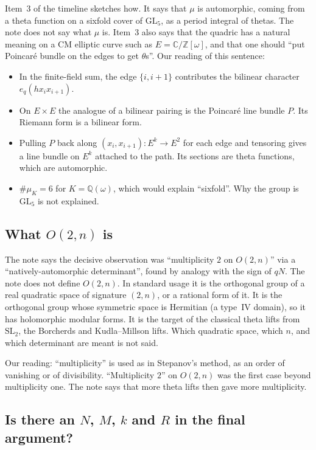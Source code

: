 \documentclass[11pt]{amsbook}
\theoremstyle{plain}
\theoremstyle{definition}
\theoremstyle{remark}
\numberwithin{equation}{section}
\numberwithin{figure}{chapter}
\numberwithin{table}{chapter}
\newcommand{\Q}{\mathbb{Q}}
\newcommand{\Z}{\mathbb{Z}}
\renewcommand{\C}{\mathbb{C}}
\begin{document}
Item~3 of the timeline sketches how. It says that $\mu$ is
automorphic, coming from a theta function on a sixfold cover of
$\mathrm{GL}_5$, as a period integral of thetas. The note does not
say what $\mu$ is. Item~3 also says that the quadric has a natural
meaning on a CM elliptic curve such as $E = \C/\Z[\omega]$, and
that one should ``put Poincar\'e bundle on the edges to get
$\theta$s''. Our reading of this sentence:
\begin{itemize}
\item In the finite-field sum, the edge $\{i, i+1\}$ contributes
  the bilinear character $e_q(h x_ix_{i+1})$.
\item On $E \times E$ the analogue of a bilinear pairing is the
  Poincar\'e line bundle $P$. Its Riemann form is a bilinear form.
\item Pulling $P$ back along $(x_i, x_{i+1}) \colon E^k \to E^2$
  for each edge and tensoring gives a line bundle on $E^k$ attached
  to the path. Its sections are theta functions, which are
  automorphic.
\item $\#\mu_K = 6$ for $K = \Q(\omega)$, which would explain
  ``sixfold''. Why the group is $\mathrm{GL}_5$ is not explained.
\end{itemize}

\subsection{What $O(2,n)$ is}

The note says the decisive observation was ``multiplicity $2$ on
$O(2,n)$'' via a ``natively-automorphic determinant'', found by
analogy with the sign of $qN$. The note does not define $O(2,n)$.
In standard usage it is the orthogonal group of a real quadratic
space of signature $(2,n)$, or a rational form of it. It is the
orthogonal group whose symmetric space is Hermitian (a type~IV
domain), so it has holomorphic modular forms. It is the target of
the classical theta lifts from $\mathrm{SL}_2$, the Borcherds and
Kudla--Millson lifts. Which quadratic space, which $n$, and which
determinant are meant is not said.

Our reading: ``multiplicity'' is used as in Stepanov's method, as
an order of vanishing or of divisibility. ``Multiplicity $2$'' on
$O(2,n)$ was the first case beyond multiplicity one. The note says
that more theta lifts then gave more multiplicity.

\subsection{Is there an $N$, $M$, $k$ and $R$ in the final
argument?}
\end{document}
